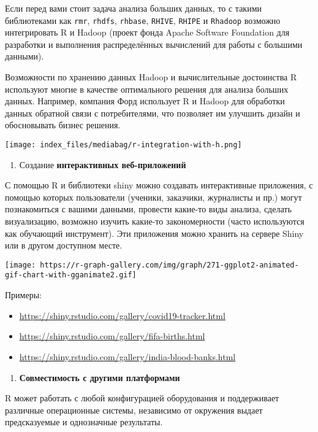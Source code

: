 \documentclass[
  letterpaper,
  DIV=11,
  numbers=noendperiod]{scrreprt}
\providecommand{\tightlist}{%
  \setlength{\itemsep}{0pt}\setlength{\parskip}{0pt}}\usepackage{longtable,booktabs,array}
\begin{document}
Если перед вами стоит задача анализа больших данных, то с такими
библиотеками как \texttt{rmr}, \texttt{rhdfs}, \texttt{rhbase},
\texttt{RHIVE}, \texttt{RHIPE} и \texttt{Rhadoop} возможно интегрировать
R и Hadoop (проект фонда Apache Software Foundation для разработки и
выполнения распределённых вычислений для работы с большими данными).

Возможности по хранению данных Hadoop и вычислительные достоинства R
используют многие в качестве оптимального решения для анализа больших
данных. Например, компания Форд использует R и Hadoop для обработки
данных обратной связи с потребителями, что позволяет им улучшить дизайн
и обосновывать бизнес решения.

\texttt{[image: index\_files/mediabag/r-integration-with-h.png]}

\begin{enumerate}
\def\labelenumi{\arabic{enumi}.}
\setcounter{enumi}{7}
\tightlist
\item
  Создание \textbf{интерактивных веб-приложений}
\end{enumerate}

С помощью R и библиотеки shiny можно создавать интерактивные приложения,
с помощью которых пользователи (ученики, заказчики, журналисты и пр.)
могут познакомиться с вашими данными, провести какие-то виды анализа,
сделать визуализацию, возможно изучить какие-то закономерности (часто
используются как обучающий инструмент). Эти приложения можно хранить на
сервере Shiny или в другом доступном месте.

\texttt{[image: https://r-graph-gallery.com/img/graph/271-ggplot2-animated-gif-chart-with-gganimate2.gif]}

Примеры:

\begin{itemize}
\tightlist
\item
  \url{https://shiny.rstudio.com/gallery/covid19-tracker.html}
\item
  \url{https://shiny.rstudio.com/gallery/fifa-births.html}
\item
  \url{https://shiny.rstudio.com/gallery/india-blood-banks.html}
\end{itemize}

\begin{enumerate}
\def\labelenumi{\arabic{enumi}.}
\setcounter{enumi}{8}
\tightlist
\item
  \textbf{Совместимость с другими платформами}
\end{enumerate}

R может работать с любой конфигурацией оборудования и поддерживает
различные операционные системы, независимо от окружения выдает
предсказуемые и однозначные результаты.
\end{document}
